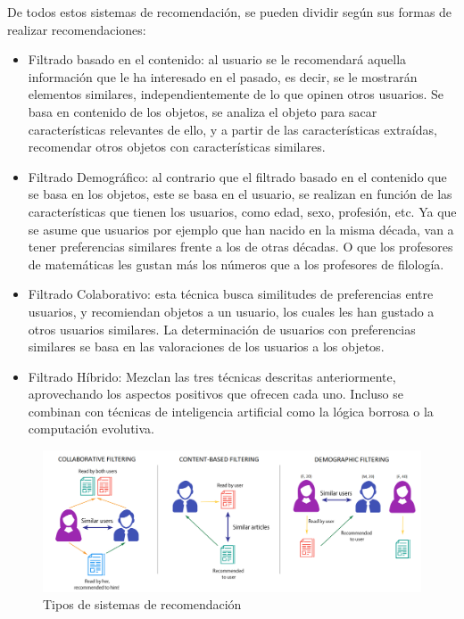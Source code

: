 De todos estos sistemas de recomendación, se pueden dividir según sus formas de realizar recomendaciones:

\begin{itemize}
    \item Filtrado basado en el contenido\cite{filtradocontenido}: al usuario se le recomendará aquella información que le ha interesado en el pasado, es decir, se le mostrarán elementos similares, independientemente de lo que opinen otros usuarios. 
    Se basa en contenido de los objetos, se analiza el objeto para sacar características relevantes de ello, y a partir de las características 
    extraídas, recomendar otros objetos con características similares.   
    \item Filtrado Demográfico\cite{filtrademografico}: al contrario que el filtrado basado en el contenido que se basa en los objetos, este se basa en el usuario,
    se realizan en función de las características que tienen los usuarios, como edad, sexo, profesión, etc. Ya que se asume que usuarios por ejemplo 
    que han nacido en la misma década, van a tener preferencias similares frente a los de otras décadas. O que los profesores de matemáticas les gustan más los números 
    que a los profesores de filología. 
    \item Filtrado Colaborativo\cite{filtradocolaborativo}: esta técnica busca similitudes de preferencias entre usuarios, y recomiendan objetos a un usuario, 
    los cuales les han gustado a otros usuarios similares. La determinación de usuarios con preferencias similares se basa en 
    las valoraciones de los usuarios a los objetos.
    \item Filtrado Híbrido\cite{filtrahibrido}: Mezclan las tres técnicas descritas anteriormente, aprovechando los aspectos positivos
    que ofrecen cada uno. Incluso se combinan con técnicas de inteligencia artificial como la lógica borrosa o la computación evolutiva. 
\end{itemize} 

\begin{figure}[H]
    \centering
    \includegraphics[width=6in, angle=0]{figures/chapter-2/recommendation_systems.png}
    \caption{Tipos de sistemas de recomendación \cite{imagefilters}}
\end{figure}

